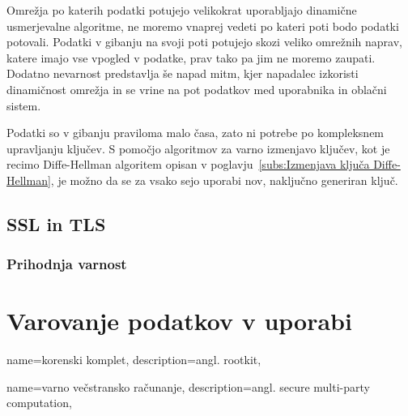 \documentclass[12pt,a4paper,openany]{book}
\begin{document}
Omrežja po katerih podatki potujejo velikokrat uporabljajo dinamične usmerjevalne algoritme, ne moremo vnaprej vedeti po kateri poti bodo podatki potovali. Podatki v gibanju na svoji poti potujejo skozi veliko omrežnih naprav, katere imajo vse vpogled v podatke, prav tako pa jim ne moremo zaupati. Dodatno nevarnost predstavlja še napad \gls{mitm}, kjer napadalec izkoristi dinamičnost omrežja in se vrine na pot podatkov med uporabnika in oblačni sistem.

Podatki so v gibanju praviloma malo časa, zato ni potrebe po kompleksnem upravljanju ključev. S pomočjo algoritmov za varno izmenjavo ključev, kot je recimo Diffe-Hellman algoritem opisan v poglavju~\ref{subs:Izmenjava ključa Diffe-Hellman}, je možno da se za vsako sejo uporabi nov, naključno generiran ključ.


\subsection{SSL in TLS}
\label{sub:SSL in TLS}

\subsubsection{Prihodnja varnost}
\label{subs:Prihodnja varnost}



\section{Varovanje podatkov v uporabi}
\label{sec:Varovanje podatkov v uporabi}

{
  name=korenski komplet,
  description={angl. rootkit},
}

{
  name=varno večstransko računanje,
  description={angl. secure multi-party computation},
}
\end{document}
